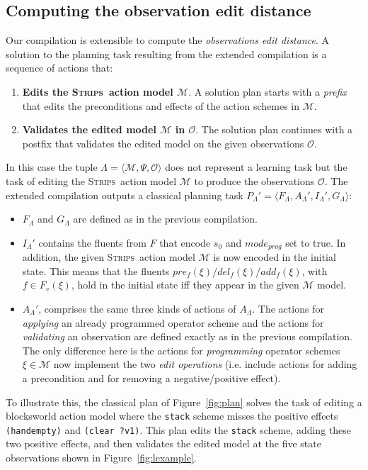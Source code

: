 \documentclass{article}
\newcommand{\tup}[1]{{\langle #1 \rangle}}
\newcommand{\strips}{\textsc{Strips}}     %
\begin{document}
\subsection{Computing the observation edit distance}
Our compilation is extensible to compute the {\em observations edit distance}. A solution to the planning task resulting from the extended compilation is a sequence of actions that:
\begin{enumerate}
\item {\bf Edits the \strips\ action model $\mathcal{M}$}. A solution plan starts with a {\em prefix} that edits the preconditions and effects of the action schemes in $\mathcal{M}$.
\item {\bf Validates the edited model $\mathcal{M}$ in $\mathcal{O}$}. The solution plan continues with a postfix that validates the edited model on the given observations $\mathcal{O}$.
\end{enumerate}

In this case the tuple $\Lambda=\tup{\mathcal{M},\Psi,\mathcal{O}}$ does not represent a learning task but the task of editing the \strips\ action model $\mathcal{M}$ to produce the observations $\mathcal{O}$. The extended compilation outputs a classical planning task $P_{\Lambda}'=\tup{F_{\Lambda},A_{\Lambda}',I_{\Lambda}',G_{\Lambda}}$:
\begin{itemize}
\item $F_{\Lambda}$ and $G_{\Lambda}$ are defined as in the previous compilation.
\item $I_{\Lambda}'$ contains the fluents from $F$ that encode $s_0$ and $mode_{prog}$ set to true. In addition, the given \strips\ action model $\mathcal{M}$ is now encoded in the initial state. This means that the fluents $pre_f(\xi)/del_f(\xi)/add_f(\xi)$, with $f\in F_v(\xi)$, hold in the initial state iff they appear in the given $\mathcal{M}$ model.
\item $A_{\Lambda}'$, comprises the same three kinds of actions of $A_{\Lambda}$. The actions for {\em applying} an already programmed operator scheme and the actions for {\em validating} an observation are defined exactly as in the previous compilation. The only difference here is the actions for {\em programming} operator schemes $\xi\in\mathcal{M}$ now implement the two {\em edit operations} (i.e. include actions for adding a precondition and for removing a negative/positive effect).
\end{itemize}

To illustrate this, the classical plan of Figure~\ref{fig:plan} solves the task of editing a blocksworld action model where the {\tt\small stack} scheme misses the positive effects {\tt(handempty)} and {\tt (clear ?v1)}. This plan edits the {\tt\small stack} scheme, adding these two positive effects, and then validates the edited model at the five state observations shown in Figure~\ref{fig:lexample}. 
\end{document}
